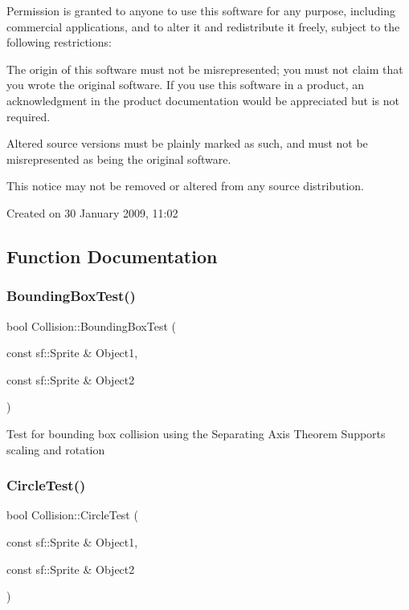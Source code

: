 Permission is granted to anyone to use this software for any purpose, including commercial applications, and to alter it and redistribute it freely, subject to the following restrictions\+:


\begin{DoxyEnumerate}
\item The origin of this software must not be misrepresented; you must not claim that you wrote the original software. If you use this software in a product, an acknowledgment in the product documentation would be appreciated but is not required.
\item Altered source versions must be plainly marked as such, and must not be misrepresented as being the original software.
\item This notice may not be removed or altered from any source distribution.

Created on 30 January 2009, 11\+:02 
\end{DoxyEnumerate}

\subsection{Function Documentation}
\mbox{\label{namespace_collision_a6f5945d467e629017010b139062919c6}} 
\subsubsection{\texorpdfstring{BoundingBoxTest()}{BoundingBoxTest()}}
{\footnotesize\ttfamily bool Collision\+::\+Bounding\+Box\+Test (\begin{DoxyParamCaption}\item[{const sf\+::\+Sprite \&}]{Object1,  }\item[{const sf\+::\+Sprite \&}]{Object2 }\end{DoxyParamCaption})}

Test for bounding box collision using the Separating Axis Theorem Supports scaling and rotation \mbox{\label{namespace_collision_af2f8835beee81b76d04311c794c36c0f}} 
\subsubsection{\texorpdfstring{CircleTest()}{CircleTest()}}
{\footnotesize\ttfamily bool Collision\+::\+Circle\+Test (\begin{DoxyParamCaption}\item[{const sf\+::\+Sprite \&}]{Object1,  }\item[{const sf\+::\+Sprite \&}]{Object2 }\end{DoxyParamCaption})}

